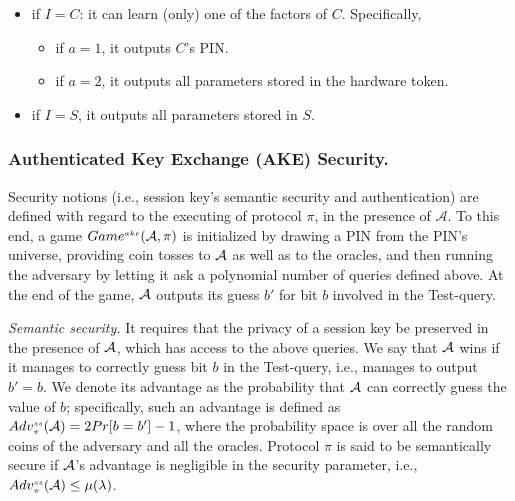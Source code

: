 \begin{itemize}
\begin{itemize}

\item if $I=C$:  it can learn (only) one of the factors of $C$. Specifically, 
%



\begin{itemize}
\item if $a=1$, it outputs $C$'s PIN. 



\item if  $a=2$, it outputs all parameters stored in the hardware token. 
  \end{itemize}
  
  
  
\item if $I=S$, it outputs all parameters stored in $S$. 
\end{itemize}
\end{itemize}


 \vspace{-5mm}
\subsubsection{Authenticated Key Exchange (AKE)  Security.} Security notions (i.e., session key's semantic security and authentication) are defined with regard to the executing of protocol $\pi$, in the presence of   $\mathcal{A}$. To this end, a game $Game^{\scriptscriptstyle ake} (\mathcal{A},\pi)$ is initialized by drawing a PIN  from the PIN's universe,
providing coin tosses to $\mathcal{A}$ as well as to the oracles, and then running the adversary by letting it ask a polynomial
number of queries defined above. At the end of the game, $\mathcal{A}$  outputs its guess $b'$ for  bit $b$
involved in the Test-query. 



\noindent\textit{Semantic security.} It requires that the privacy of a session key be preserved in the presence of $\mathcal{A}$, which has access to the above queries. We say that $\mathcal{A}$  wins if it manages to correctly guess bit $b$ in the Test-query, i.e., manages to output $b'=b$. We denote its advantage as the probability that $\mathcal{A}$  can correctly guess the value of $b$; specifically, such an advantage is defined as $Adv_{\scriptscriptstyle\pi}^{\scriptscriptstyle ss}(\mathcal{A})=2Pr[b=b']-1$, where the probability space is over all the random coins of the adversary and all the oracles.  Protocol $\pi$ is said to be semantically secure if $\mathcal{A}$'s advantage is negligible in the security parameter, i.e., $Adv_{\scriptscriptstyle\pi}^{\scriptscriptstyle ss}(\mathcal{A})\leq \mu(\lambda)$.


